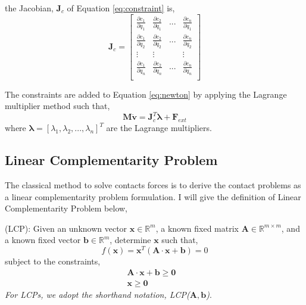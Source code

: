     the Jacobian, $\pmb{J}_{c}$ of Equation \ref{eq:constraint} is,
    \begin{equation}
        \pmb{J}_{c} = 
        \begin{bmatrix}
            \frac{\partial{c_1}}{\partial{q_1}} & \frac{\partial{c_2}}{\partial{q_1}} & ... & \frac{\partial{c_n}}{\partial{q_1}} \\
            \frac{\partial{c_1}}{\partial{q_2}} & \frac{\partial{c_2}}{\partial{q_2}} & ... & \frac{\partial{c_n}}{\partial{q_2}} \\
            \vdots & \vdots & & \vdots\\
            \frac{\partial{c_1}}{\partial{q_n}} & \frac{\partial{c_2}}{\partial{q_n}} & ... & \frac{\partial{c_n}}{\partial{q_n}} \\
        \end{bmatrix}
        \label{Jacobianb}
    \end{equation}

    The constraints are added to Equation \ref{eq:newton} by applying the Lagrange multiplier method such that,
    \begin{equation}
        \pmb{M}\dot{\mathbf{v}} = \pmb{J}_{c}^{T}\pmb{\lambda} + \mathbf{F}_{ext}
        \label{eq:cone}
    \end{equation}
    where $\pmb{\lambda} = [\lambda_1, \lambda_2, ... , \lambda_n]^T$ are the Lagrange multipliers.

\subsection{Linear Complementarity Problem}
The classical method to solve contacts forces is to derive the contact problems as a linear complementarity problem formulation. I will give the definition of Linear Complementarity Problem below, 

    (LCP): Given an unknown vector $\mathbf{x} \in \mathbb{R}^{m}$, a known fixed matrix $\pmb{A} \in \mathbb{R}^{m\times m}$, and a known fixed vector $\pmb{b} \in \mathbb{R}^{m}$, determine $\mathbf{x}$ such that,
    \begin{equation}
        f(\mathbf{x}) = \mathbf{x}^{T}(\pmb{A}\cdot\mathbf{x} + \pmb{b}) = 0
    \end{equation}
    subject to the constraints,
    \begin{subequations}
    \begin{align}
        \pmb{A}\cdot\mathbf{x} + \pmb{b} \ge \pmb{0} & \\
        \mathbf{x} \ge \pmb{0} &
    \end{align}
    \end{subequations}
    \textit{For LCPs, we adopt the shorthand notation, LCP($\pmb{A}, \pmb{b}$)}.


